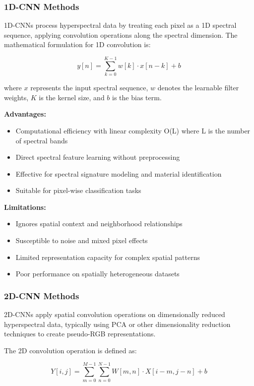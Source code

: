 \documentclass[journal]{IEEEtran}
\begin{document}
\subsubsection{1D-CNN Methods}

1D-CNNs process hyperspectral data by treating each pixel as a 1D spectral sequence, applying convolution operations along the spectral dimension. The mathematical formulation for 1D convolution is:

\begin{equation}
y[n] = \sum_{k=0}^{K-1} w[k] \cdot x[n-k] + b
\end{equation}

where $x$ represents the input spectral sequence, $w$ denotes the learnable filter weights, $K$ is the kernel size, and $b$ is the bias term.

\textbf{Advantages:}
\begin{itemize}
\item Computational efficiency with linear complexity O(L) where L is the number of spectral bands
\item Direct spectral feature learning without preprocessing
\item Effective for spectral signature modeling and material identification
\item Suitable for pixel-wise classification tasks
\end{itemize}

\textbf{Limitations:}
\begin{itemize}
\item Ignores spatial context and neighborhood relationships
\item Susceptible to noise and mixed pixel effects
\item Limited representation capacity for complex spatial patterns
\item Poor performance on spatially heterogeneous datasets
\end{itemize}

\subsubsection{2D-CNN Methods}

2D-CNNs apply spatial convolution operations on dimensionally reduced hyperspectral data, typically using PCA or other dimensionality reduction techniques to create pseudo-RGB representations.

The 2D convolution operation is defined as:

\begin{equation}
Y[i,j] = \sum_{m=0}^{M-1} \sum_{n=0}^{N-1} W[m,n] \cdot X[i-m, j-n] + b
\end{equation}
\end{document}
